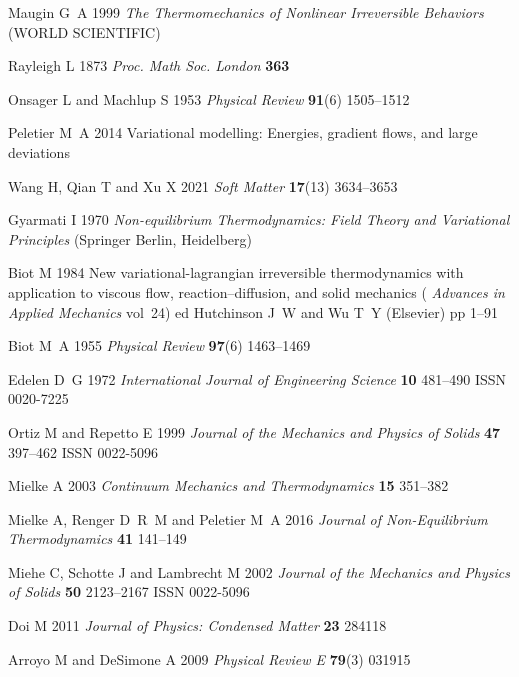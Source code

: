 \documentclass[12pt]{iopart}
\begin{document}
\begin{thebibliography}{100}
				Maugin G~A 1999 {\em The Thermomechanics of Nonlinear Irreversible Behaviors\/}
				  (WORLD SCIENTIFIC)
				
				Rayleigh L 1873 {\em Proc. Math Soc. London\/} {\bf 363}
				
				Onsager L and Machlup S 1953 {\em Physical Review\/} {\bf 91}(6) 1505--1512
				
				Peletier M~A 2014 Variational modelling: Energies, gradient flows, and large
				  deviations
				
				Wang H, Qian T and Xu X 2021 {\em Soft Matter\/} {\bf 17}(13) 3634--3653
				
				Gyarmati I 1970 {\em Non-equilibrium Thermodynamics: Field Theory and
				  Variational Principles\/} (Springer Berlin, Heidelberg)
				
				Biot M 1984 New variational-lagrangian irreversible thermodynamics with
				  application to viscous flow, reaction--diffusion, and solid mechanics ({\em
				  Advances in Applied Mechanics\/} vol~24) ed Hutchinson J~W and Wu T~Y
				  (Elsevier) pp 1--91
				
				Biot M~A 1955 {\em Physical Review\/} {\bf 97}(6) 1463--1469
				
				Edelen D~G 1972 {\em International Journal of Engineering Science\/} {\bf 10}
				  481--490 ISSN 0020-7225
				
				Ortiz M and Repetto E 1999 {\em Journal of the Mechanics and Physics of
				  Solids\/} {\bf 47} 397--462 ISSN 0022-5096
				
				Mielke A 2003 {\em Continuum Mechanics and Thermodynamics\/} {\bf 15} 351--382
				
				Mielke A, Renger D~R~M and Peletier M~A 2016 {\em Journal of Non-Equilibrium
				  Thermodynamics\/} {\bf 41} 141--149
				
				Miehe C, Schotte J and Lambrecht M 2002 {\em Journal of the Mechanics and
				  Physics of Solids\/} {\bf 50} 2123--2167 ISSN 0022-5096
				
				Doi M 2011 {\em Journal of Physics: Condensed Matter\/} {\bf 23} 284118
				
				Arroyo M and DeSimone A 2009 {\em Physical Review E\/} {\bf 79}(3) 031915
				

\end{thebibliography}
\end{document}
